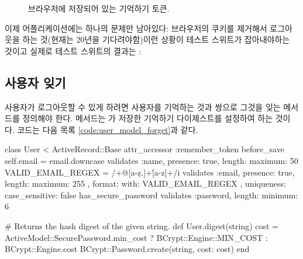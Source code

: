 {{\begin{figure} \begin{center}  \end{center} \caption{브라우저에 저장되어 있는 기억하기 토큰.\label{fig:cookie_in_browser}} \end{figure} 

이제 어플리케이션에는 하나의 문제만 남아있다: 브라우저의 쿠키를 제거해서 로그아웃을 하는 것(현재는 20년을 기다려야함)이런 상황이 테스트 스위트가 잡아내야하는 것이고 실제로 테스트 스위트의 결과는 : 

\begin{codelisting}  

 \end{codelisting} 

\subsection{사용자 잊기} \label{sec:forgetting_users} 

사용자가 로그아웃할 수 있게 하려면 사용자를 기억하는 것과 쌍으로 그것을 잊는 메서드를 정의해야 한다.  메서드는 가 저장한 기억하기 다이제스트를  설정하여 하는 것이다. 코드는 다음 목록 \ref{code:user_model_forget}과 같다. 

\begin{codelisting} \label{code:user_model_forget}  

\begin{code} class User < ActiveRecord::Base attr_accessor :remember_token before_save { self.email = email.downcase } validates :name, presence: true, length: { maximum: 50 } VALID_EMAIL_REGEX = /\A[\w+\-.]+@[a-z\d\-.]+\.[a-z]+\z/i validates :email, presence: true, length: { maximum: 255 }, format: { with: VALID_EMAIL_REGEX }, uniqueness: { case_sensitive: false } has_secure_password validates :password, length: { minimum: 6 } 

# Returns the hash digest of the given string. def User.digest(string) cost = ActiveModel::SecurePassword.min_cost ? BCrypt::Engine::MIN_COST : BCrypt::Engine.cost BCrypt::Password.create(string, cost: cost) end 


\end{code}
\end{codelisting}}}
